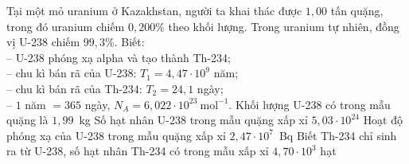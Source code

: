 	\begin{ex}%
		Tại một mỏ uranium ở Kazakhstan, người ta khai thác được $1{,}00$ tấn quặng, trong đó uranium chiếm $0{,}200\%$ theo khối lượng. Trong uranium tự nhiên, đồng vị U-238 chiếm $99{,}3\%$. Biết:\\
		-- U-238 phóng xạ alpha và tạo thành Th-234;\\
		-- chu kì bán rã của U-238: $T_1=4{,}47\cdot 10^9$ năm;\\
		-- chu kì bán rã của Th-234: $T_2=24{,}1$ ngày;\\
		-- $1$ năm $=365$ ngày, $N_A=6{,}022\cdot 10^{23}~\text{mol}^{-1}$.
		\choiceTFt
		{\True Khối lượng U-238 có trong mẫu quặng là $1{,}99$~kg}
		{\True Số hạt nhân U-238 trong mẫu quặng xấp xỉ $5{,}03\cdot 10^{24}$}
		{\True Hoạt độ phóng xạ của U-238 trong mẫu quặng xấp xỉ $2{,}47\cdot 10^7$~Bq}
		{Biết Th-234 chỉ sinh ra từ U-238, số hạt nhân Th-234 có trong mẫu xấp xỉ $4{,}70\cdot 10^3$ hạt}
	\end{ex}

